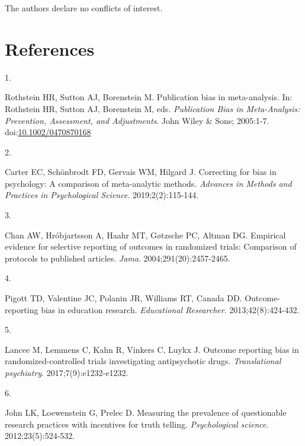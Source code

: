 \documentclass[
  man, donotrepeattitle,floatsintext]{apa7}
\newlength{\cslhangindent}
\newlength{\csllabelwidth}
\newenvironment{CSLReferences}[2] %
 {\begin{list}{}{%
  \setlength{\itemindent}{0pt}
  \setlength{\leftmargin}{0pt}
  \setlength{\parsep}{0pt}
  \ifodd #1
   \setlength{\leftmargin}{\cslhangindent}
   \setlength{\itemindent}{-1\cslhangindent}
  \fi
  \setlength{\itemsep}{#2\baselineskip}}}
 {\end{list}}
\newcommand{\CSLLeftMargin}[1]{\parbox[t]{\csllabelwidth}{\strut#1\strut}}
\newcommand{\CSLRightInline}[1]{\parbox[t]{\linewidth - \csllabelwidth}{\strut#1\strut}}
\begin{document}
The authors declare no conflicts of interest.

\section*{References}\label{references}

\begingroup
\singlespacing
\setlength{\parindent}{-0.5in}
\setlength{\leftskip}{0.5in}

\label{refs}
\begin{CSLReferences}{0}{1}
\CSLLeftMargin{1. }%
\CSLRightInline{Rothstein HR, Sutton AJ, Borenstein M. Publication bias in meta-analysis. In: Rothstein HR, Sutton AJ, Borenstein M, eds. \emph{Publication {Bias} in {Meta-Analysis}: {Prevention}, {Assessment}, and {Adjustments}}. {John Wiley \& Sons}; 2005:1-7. doi:\href{https://doi.org/10.1002/0470870168}{10.1002/0470870168}}

\CSLLeftMargin{2. }%
\CSLRightInline{Carter EC, Schönbrodt FD, Gervais WM, Hilgard J. Correcting for bias in psychology: A comparison of meta-analytic methods. \emph{Advances in Methods and Practices in Psychological Science}. 2019;2(2):115-144.}

\CSLLeftMargin{3. }%
\CSLRightInline{Chan AW, Hróbjartsson A, Haahr MT, Gøtzsche PC, Altman DG. Empirical evidence for selective reporting of outcomes in randomized trials: Comparison of protocols to published articles. \emph{Jama}. 2004;291(20):2457-2465.}

\CSLLeftMargin{4. }%
\CSLRightInline{Pigott TD, Valentine JC, Polanin JR, Williams RT, Canada DD. Outcome-reporting bias in education research. \emph{Educational Researcher}. 2013;42(8):424-432.}

\CSLLeftMargin{5. }%
\CSLRightInline{Lancee M, Lemmens C, Kahn R, Vinkers C, Luykx J. Outcome reporting bias in randomized-controlled trials investigating antipsychotic drugs. \emph{Translational psychiatry}. 2017;7(9):e1232-e1232.}

\CSLLeftMargin{6. }%
\CSLRightInline{John LK, Loewenstein G, Prelec D. Measuring the prevalence of questionable research practices with incentives for truth telling. \emph{Psychological science}. 2012;23(5):524-532.}


\end{CSLReferences}
\end{document}
